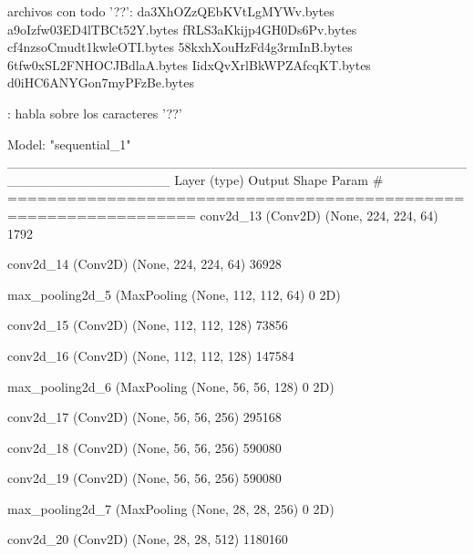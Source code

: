 \documentclass[11pt, a4paper]{article} %
\begin{document}
archivos con todo '??':
da3XhOZzQEbKVtLgMYWv.bytes
a9oIzfw03ED4lTBCt52Y.bytes
fRLS3aKkijp4GH0Ds6Pv.bytes
cf4nzsoCmudt1kwleOTI.bytes
58kxhXouHzFd4g3rmInB.bytes
6tfw0xSL2FNHOCJBdlaA.bytes
IidxQvXrlBkWPZAfcqKT.bytes
d0iHC6ANYGon7myPFzBe.bytes

\citep{narayanan2016performance} : habla sobre los caracteres '??'


Model: "sequential_1"
_________________________________________________________________
 Layer (type)                Output Shape              Param #   
=================================================================
 conv2d_13 (Conv2D)          (None, 224, 224, 64)      1792      
                                                                 
 conv2d_14 (Conv2D)          (None, 224, 224, 64)      36928     
                                                                 
 max_pooling2d_5 (MaxPooling  (None, 112, 112, 64)     0         
 2D)                                                             
                                                                 
 conv2d_15 (Conv2D)          (None, 112, 112, 128)     73856     
                                                                 
 conv2d_16 (Conv2D)          (None, 112, 112, 128)     147584    
                                                                 
 max_pooling2d_6 (MaxPooling  (None, 56, 56, 128)      0         
 2D)                                                             
                                                                 
 conv2d_17 (Conv2D)          (None, 56, 56, 256)       295168    
                                                                 
 conv2d_18 (Conv2D)          (None, 56, 56, 256)       590080    
                                                                 
 conv2d_19 (Conv2D)          (None, 56, 56, 256)       590080    
                                                                 
 max_pooling2d_7 (MaxPooling  (None, 28, 28, 256)      0         
 2D)                                                             
                                                                 
 conv2d_20 (Conv2D)          (None, 28, 28, 512)       1180160   
                                                                 
\end{document}
